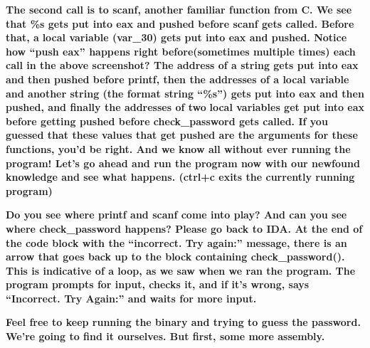 \documentclass[letterpaper]{article}
\newcommand{\sitfig}[3]{
\begin{figure}[H]
\centering
\makebox[\textwidth][c]{
#2
}
\label{#1}
\end{figure}
}
\newcommand{\sitgfx}[4][scale=1.0]{
\sitfig{#3}{\texttt{[image: \#2]}}{#4}
}
\begin{document}
  
\sitgfx[width=6.5in,height=4.611in]{FINALWORKINGDOCFORMERLYPRECURSOR-img014.png}{fig:unk}{TODO CAPTION}
 \textbf{\newline
The second call is to scanf, another familiar function from C. We see that \%s gets put into eax and pushed before scanf
gets called. Before that, a }\textbf{\textcolor[rgb]{0.21960784,0.4627451,0.11372549}{local variable
}}\textbf{(var\_30) gets put into eax and pushed. Notice how ``push eax'' happens right before(sometimes multiple
times) each call in the above screenshot? The address of a string gets put into eax and then pushed before printf, then
the addresses of a local variable and another string (the format string ``\%s'') gets put into eax and then pushed, and
finally the addresses of two }\textbf{\textcolor[rgb]{0.21960784,0.4627451,0.11372549}{local variables }}\textbf{get
put into eax before getting pushed before check\_password gets called. If you guessed that these values that get pushed
are the arguments for these functions, you'd be right. And we know all without ever running the program! Let's go ahead
and run the program now with our newfound knowledge and see what happens. (ctrl+c exits the currently running
program)\newline
}  
\sitgfx[width=6.5in,height=1.139in]{FINALWORKINGDOCFORMERLYPRECURSOR-img015.png}{fig:unk}{TODO CAPTION}
 

\textbf{Do you see where printf and scanf come into play? And can you see where check\_password happens? Please go back
to IDA. At the end of the code block with the ``incorrect. Try again:'' message, there is an arrow that goes back up to
the block containing check\_password(). This is indicative of a loop, as we saw when we ran the program. The program
prompts for input, checks it, and if it's wrong, says ``Incorrect. Try Again:'' and waits for more input.  }
\sitgfx[width=6.5in,height=3.028in]{FINALWORKINGDOCFORMERLYPRECURSOR-img016.png}{fig:unk}{TODO CAPTION}
 \textbf{\newline
Feel free to keep running the binary and trying to guess the password. We're going to find it ourselves. But first, some
more assembly. \newline
}
\end{document}
